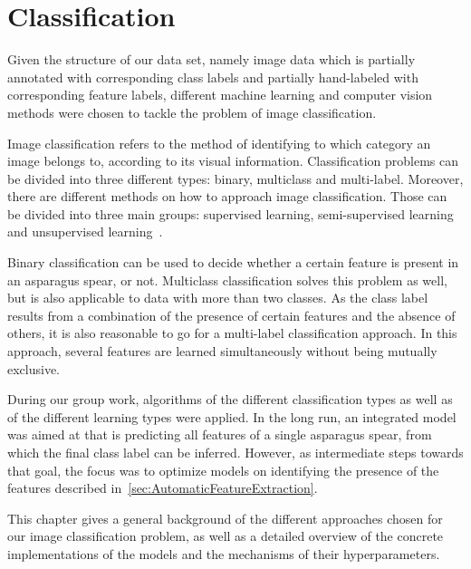 %
\section{Classification}
\label{ch:Classification}

Given the structure of our data set, namely image data which is partially annotated with corresponding class labels and partially hand-labeled with corresponding feature labels, different machine learning and computer vision methods were chosen to tackle the problem of image classification.

\bigskip
Image classification refers to the method of identifying to which category an image belongs to, according to its visual information. Classification problems can be divided into three different types: binary, multiclass and multi-label. Moreover, there are different methods on how to approach image classification. Those can be divided into three main groups: supervised learning, semi-supervised learning and unsupervised learning~\citep{har2003constraint}. 

Binary classification can be used to decide whether a certain feature is present in an asparagus spear, or not. Multiclass classification solves this problem as well, but is also applicable to data with more than two classes. As the class label results from a combination of the presence of certain features and the absence of others, it is also reasonable to go for a multi-label classification approach. In this approach, several features are learned simultaneously without being mutually exclusive.

During our group work, algorithms of the different classification types as well as of the different learning types were applied.
In the long run, an integrated model was aimed at that is predicting all features of a single asparagus spear, from which the final class label can be inferred. However, as intermediate steps towards that goal, the focus was to optimize models on identifying the presence of the features described in~\autoref{sec:AutomaticFeatureExtraction}. 

\bigskip
This chapter gives a general background of the different approaches chosen for our image classification problem, as well as a detailed overview of the concrete implementations of the models and the mechanisms of their hyperparameters. 


